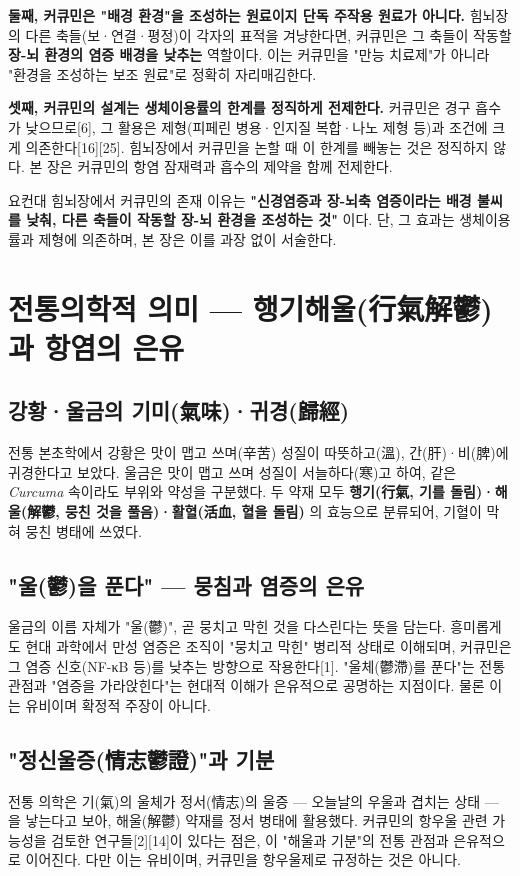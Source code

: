 \documentclass[11pt,oneside]{book}
\begin{document}
\textbf{둘째, 커큐민은 "배경 환경"을 조성하는 원료이지 단독 주작용 원료가 아니다.} 힘뇌장의 다른 축들(보·연결·평정)이 각자의 표적을 겨냥한다면, 커큐민은 그 축들이 작동할 \textbf{장-뇌 환경의 염증 배경을 낮추는} 역할이다. 이는 커큐민을 "만능 치료제"가 아니라 "환경을 조성하는 보조 원료"로 정확히 자리매김한다.

\textbf{셋째, 커큐민의 설계는 생체이용률의 한계를 정직하게 전제한다.} 커큐민은 경구 흡수가 낮으므로[6], 그 활용은 제형(피페린 병용·인지질 복합·나노 제형 등)과 조건에 크게 의존한다[16][25]. 힘뇌장에서 커큐민을 논할 때 이 한계를 빼놓는 것은 정직하지 않다. 본 장은 커큐민의 항염 잠재력과 흡수의 제약을 함께 전제한다.

요컨대 힘뇌장에서 커큐민의 존재 이유는 \textbf{"신경염증과 장-뇌축 염증이라는 배경 불씨를 낮춰, 다른 축들이 작동할 장-뇌 환경을 조성하는 것"} 이다. 단, 그 효과는 생체이용률과 제형에 의존하며, 본 장은 이를 과장 없이 서술한다.

\section{전통의학적 의미 — 행기해울(行氣解鬱)과 항염의 은유}
\subsection{강황·울금의 기미(氣味)·귀경(歸經)}
전통 본초학에서 강황은 맛이 맵고 쓰며(辛苦) 성질이 따뜻하고(溫), 간(肝)·비(脾)에 귀경한다고 보았다. 울금은 맛이 맵고 쓰며 성질이 서늘하다(寒)고 하여, 같은 \textit{Curcuma} 속이라도 부위와 약성을 구분했다. 두 약재 모두 \textbf{행기(行氣, 기를 돌림)·해울(解鬱, 뭉친 것을 풀음)·활혈(活血, 혈을 돌림)} 의 효능으로 분류되어, 기혈이 막혀 뭉친 병태에 쓰였다.

\subsection{"울(鬱)을 푼다" — 뭉침과 염증의 은유}
울금의 이름 자체가 "울(鬱)", 곧 뭉치고 막힌 것을 다스린다는 뜻을 담는다. 흥미롭게도 현대 과학에서 만성 염증은 조직이 "뭉치고 막힌" 병리적 상태로 이해되며, 커큐민은 그 염증 신호(NF-κB 등)를 낮추는 방향으로 작용한다[1]. "울체(鬱滯)를 푼다"는 전통 관점과 "염증을 가라앉힌다"는 현대적 이해가 은유적으로 공명하는 지점이다. 물론 이는 유비이며 확정적 주장이 아니다.

\subsection{"정신울증(情志鬱證)"과 기분}
전통 의학은 기(氣)의 울체가 정서(情志)의 울증 — 오늘날의 우울과 겹치는 상태 — 을 낳는다고 보아, 해울(解鬱) 약재를 정서 병태에 활용했다. 커큐민의 항우울 관련 가능성을 검토한 연구들[2][14]이 있다는 점은, 이 "해울과 기분"의 전통 관점과 은유적으로 이어진다. 다만 이는 유비이며, 커큐민을 항우울제로 규정하는 것은 아니다.
\end{document}

